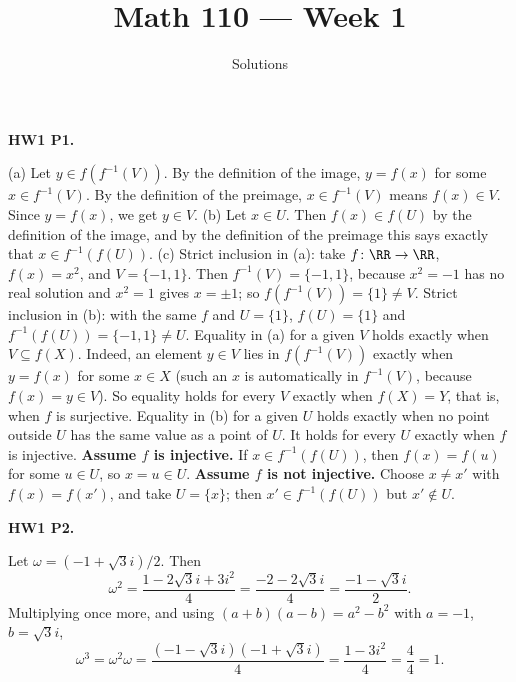 \documentclass[10pt]{scrartcl}
\title{Math 110 --- Week 1}
\subtitle{Solutions}
\author{}\date{}\ihead{}
\begin{document}
\maketitle

\begin{prob}\textbf{HW1 P1.}\par{}
\begin{steps}
  \ii (a) Let $y\in f(f^{-1}(V))$. By the definition of the image, $y=f(x)$ for some $x\in f^{-1}(V)$. By the definition of the preimage, $x\in f^{-1}(V)$ means $f(x)\in V$. Since $y=f(x)$, we get $y\in V$.
  \ii (b) Let $x\in U$. Then $f(x)\in f(U)$ by the definition of the image, and by the definition of the preimage this says exactly that $x\in f^{-1}(f(U))$.
  \ii (c) Strict inclusion in (a): take $f\colon\RR\to\RR$, $f(x)=x^2$, and $V=\{-1,1\}$. Then $f^{-1}(V)=\{-1,1\}$, because $x^2=-1$ has no real solution and $x^2=1$ gives $x=\pm1$; so $f(f^{-1}(V))=\{1\}\ne V$. Strict inclusion in (b): with the same $f$ and $U=\{1\}$, $f(U)=\{1\}$ and $f^{-1}(f(U))=\{-1,1\}\ne U$.
  \ii Equality in (a) for a given $V$ holds exactly when $V\subseteq f(X)$. Indeed, an element $y\in V$ lies in $f(f^{-1}(V))$ exactly when $y=f(x)$ for some $x\in X$ (such an $x$ is automatically in $f^{-1}(V)$, because $f(x)=y\in V$). So equality holds for every $V$ exactly when $f(X)=Y$, that is, when $f$ is surjective.
  \ii Equality in (b) for a given $U$ holds exactly when no point outside $U$ has the same value as a point of $U$. It holds for every $U$ exactly when $f$ is injective. \textbf{Assume $f$ is injective.} If $x\in f^{-1}(f(U))$, then $f(x)=f(u)$ for some $u\in U$, so $x=u\in U$. \textbf{Assume $f$ is not injective.} Choose $x\ne x'$ with $f(x)=f(x')$, and take $U=\{x\}$; then $x'\in f^{-1}(f(U))$ but $x'\notin U$.
\end{steps}
\end{prob}

\begin{prob}\textbf{HW1 P2.}\par{}
\begin{steps}
  \ii Let $\omega=(-1+\sqrt3i)/2$. Then
  \[
    \omega^2=\frac{1-2\sqrt3i+3i^2}{4}=\frac{-2-2\sqrt3i}{4}=\frac{-1-\sqrt3i}{2}.
  \]
  \ii Multiplying once more, and using $(a+b)(a-b)=a^2-b^2$ with $a=-1$, $b=\sqrt3 i$,
  \[
    \omega^3=\omega^2\omega=\frac{(-1-\sqrt3i)(-1+\sqrt3i)}{4}=\frac{1-3i^2}{4}=\frac{4}{4}=1.
  \]
\end{steps}
\end{prob}
\end{document}
